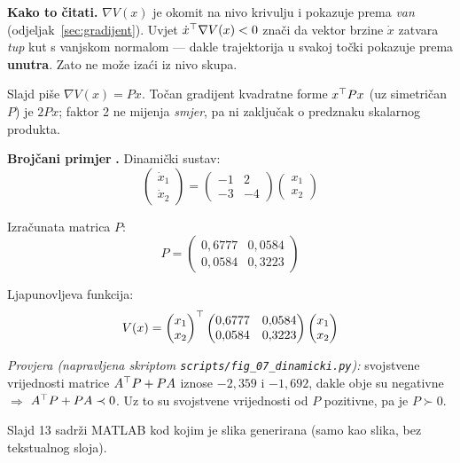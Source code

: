 \textbf{Kako to čitati.} $\nabla V(x)$ je okomit na nivo krivulju i pokazuje
prema \emph{van} (odjeljak~\ref{sec:gradijent}). Uvjet
$\dot x^{\top}\nabla V(x) < 0$ znači da vektor brzine $\dot x$ zatvara \emph{tup} kut
s vanjskom normalom --- dakle trajektorija u svakoj točki pokazuje prema
\textbf{unutra}. Zato ne može izaći iz nivo skupa.

\begin{napomena}
Slajd piše $\nabla V(x) = Px$. Točan gradijent kvadratne forme $x^{\top} Px$ (uz
simetričan $P$) je $2Px$; faktor 2 ne mijenja \emph{smjer}, pa ni zaključak o
predznaku skalarnog produkta.
\end{napomena}

\textbf{Brojčani primjer} \textbf{.} Dinamički sustav:
\[
\begin{pmatrix}\dot x_1\\ \dot x_2\end{pmatrix}
= \begin{pmatrix}-1 & 2\\ -3 & -4\end{pmatrix}
\begin{pmatrix}x_1\\ x_2\end{pmatrix}
\]

Izračunata matrica $P$:
\[
P = \begin{pmatrix}0{,}6777 & 0{,}0584\\ 0{,}0584 & 0{,}3223\end{pmatrix}
\]

Ljapunovljeva funkcija:
\[
V(x) = \begin{pmatrix}x_1\\x_2\end{pmatrix}^{\top}
\begin{pmatrix}0{,}6777 & 0{,}0584\\ 0{,}0584 & 0{,}3223\end{pmatrix}
\begin{pmatrix}x_1\\x_2\end{pmatrix}
\]

\emph{Provjera (napravljena skriptom \texttt{scripts/fig\_07\_dinamicki.py}):}
svojstvene vrijednosti matrice $A^{\top} P + PA$ iznose $-2{,}359$ i $-1{,}692$,
dakle obje su negativne $\Rightarrow$ $A^{\top} P + PA \prec 0$. \checkmark
Uz to su svojstvene vrijednosti od $P$ pozitivne, pa je $P \succ 0$.

Slajd 13 sadrži MATLAB kod kojim je slika generirana (samo kao slika, bez
tekstualnog sloja).


